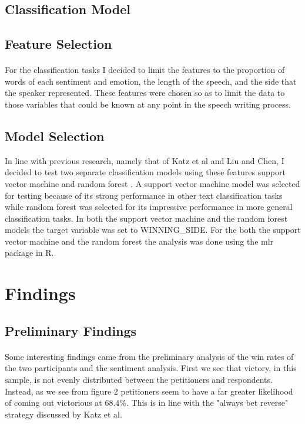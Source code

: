 \documentclass[12pt,english]{article}
\begin{document}
\subsection{Classification Model}
\subsection{Feature Selection}
\paragraph{}
For the classification tasks I decided to limit the features to the proportion of words of each sentiment and emotion, the length of the speech, and the side that the speaker represented. These features were chosen so as to limit the data to those variables that could be known at any point in the speech writing process.
\subsection{Model Selection}
In line with previous research, namely that of Katz et al and Liu and Chen, I decided to test two separate classification models using these features support vector machine \citep{liu_two-phase_2018} and random forest \citep{katz_general_2017}. A support vector machine model was selected for testing because of its strong performance in other text classification tasks while random forest was selected for its impressive performance in more general classification tasks. In both the support vector machine and the random forest models the target variable was set to WINNING\_SIDE. For the both the support vector machine and the random forest the analysis was done using the mlr package in R. 

\section{Findings}
\subsection{Preliminary Findings}
\paragraph{}
Some interesting findings came from the preliminary analysis of the win rates of the two participants and the sentiment analysis. First we see that victory, in this sample, is not evenly distributed between the petitioners and respondents. Instead, as we see from figure 2 petitioners seem to have a far greater likelihood of coming out victorious at 68.4\%. This is in line with the "always bet reverse" strategy discussed by Katz et al. 
\end{document}
